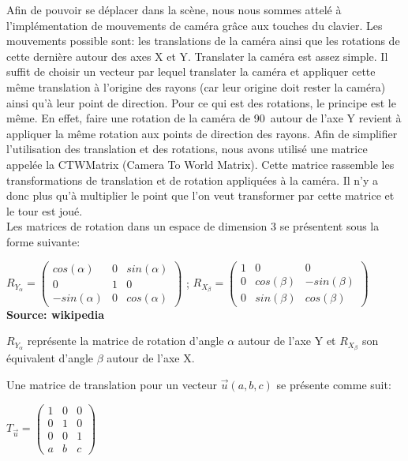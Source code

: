 \documentclass[../../Rapport RayTracer]{subfiles}
\begin{document}
Afin de pouvoir se déplacer dans la scène, nous nous sommes attelé à l'implémentation de mouvements de caméra grâce aux touches du clavier. Les mouvements possible sont: les translations de la caméra ainsi que les rotations de cette dernière autour des axes X et Y. Translater la caméra est assez simple. Il suffit de choisir un vecteur par lequel translater la caméra et appliquer cette même translation à l'origine des rayons (car leur origine doit rester la caméra) ainsi qu'à leur point de direction. Pour ce qui est des rotations, le principe est le même. En effet, faire une rotation de la caméra de 90\degree\ autour de l'axe Y revient à appliquer la même rotation aux points de direction des rayons. Afin de simplifier l'utilisation des translation et des rotations, nous avons utilisé une matrice appelée la CTWMatrix (Camera To World Matrix). Cette matrice rassemble les transformations de translation et de rotation appliquées à la caméra. Il n'y a donc plus qu'à multiplier le point que l'on veut transformer par cette matrice et le tour est joué.\\
Les matrices de rotation dans un espace de dimension 3 se présentent sous la forme suivante:

\begin{center}
	$R_{Y_{\alpha}} =
	\begin{pmatrix}
		cos(\alpha) & 0 & sin(\alpha)\\
		0 & 1 & 0\\
		-sin(\alpha) & 0 & cos(\alpha)
	\end{pmatrix}
	$ ;
	$R_{X_{\beta}} = 
	\begin{pmatrix}
		1 & 0 & 0\\
		0 & cos(\beta) & -sin(\beta)\\
		0 & sin(\beta) & cos(\beta)
	\end{pmatrix}
	$\\
	\textbf{Source: wikipedia} \cite{wikipediaRotationMatrices}
\end{center}
$R_{Y_{\alpha}}$ représente la matrice de rotation d'angle $\alpha$ autour de l'axe Y et $R_{X_{\beta}}$ son équivalent d'angle $\beta$ autour de l'axe X.

Une matrice de translation pour un vecteur $\overrightarrow{u}(a, b, c)$ se présente comme suit:
\begin{center}
	$T_{\overrightarrow{u}} =
	\begin{pmatrix}
		1 & 0 & 0\\
		0 & 1 & 0\\
		0 & 0 & 1\\
		a & b & c
	\end{pmatrix}
	$
\end{center}
\end{document}
